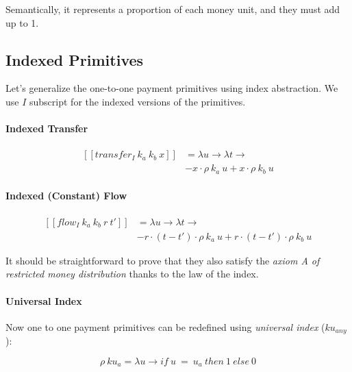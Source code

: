 Semantically, it represents a proportion of each money unit, and they must add up to 1.

\subsection{Indexed Primitives}

Let's generalize the one-to-one payment primitives using index abstraction. We use $I$ subscript for
the indexed versions of the primitives.

\paragraph{Indexed Transfer}

\begin{equation}
    \begin{split}
        [\![transfer_I\ k_a\ k_b\ x]\!] &=
        \lambda u \rightarrow \lambda t \rightarrow \\
        &-x \cdot \rho\ k_a\ u + x \cdot \rho\ k_b\ u
    \end{split}
\end{equation}

\paragraph{Indexed (Constant) Flow}

\begin{equation}
    \begin{split}
        [\![flow_I\ k_a\ k_b\ r\ t']\!] &=
        \lambda u \rightarrow \lambda t \rightarrow \\
        &-r \cdot (t - t') \cdot \rho\ k_a\ u + r \cdot (t - t') \cdot \rho\ k_b\ u
    \end{split}
\end{equation}

It should be straightforward to prove that they also satisfy the \textit{axiom A of restricted money
distribution} thanks to the law of the index.

\paragraph{Universal Index}

Now one to one payment primitives can be redefined using \textit{universal index} ($ku_{any}$):

\begin{equation}
    \rho\ ku_{a} = \lambda u \rightarrow if\ u\ =\ u_a\ then\ 1\ else\ 0
\end{equation}

